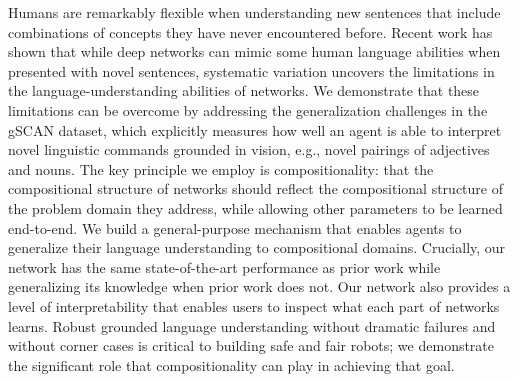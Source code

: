 Humans are remarkably flexible when understanding new sentences that include combinations of concepts they have never encountered before.    Recent work has shown that while deep networks can mimic some human language abilities when presented with novel sentences, systematic variation uncovers the limitations in the language-understanding abilities of networks.   We demonstrate that these limitations can be overcome by addressing the generalization challenges in the gSCAN dataset,  which explicitly measures how well an agent is able to interpret novel linguistic commands grounded in vision, e.g., novel pairings of adjectives and nouns. The key principle we employ is compositionality:  that the compositional structure of networks should reflect the compositional structure of the problem domain they address, while allowing other parameters to be learned end-to-end. We build a general-purpose mechanism that enables agents to generalize their language understanding to compositional domains.   Crucially,  our network has the same state-of-the-art performance as prior work while generalizing its knowledge when prior work does not. Our network also provides a  level of interpretability that enables users to inspect what each part of networks learns. Robust grounded language understanding without dramatic failures and without corner cases is critical to building safe and fair robots; we demonstrate the significant role that compositionality can play in achieving that goal.
